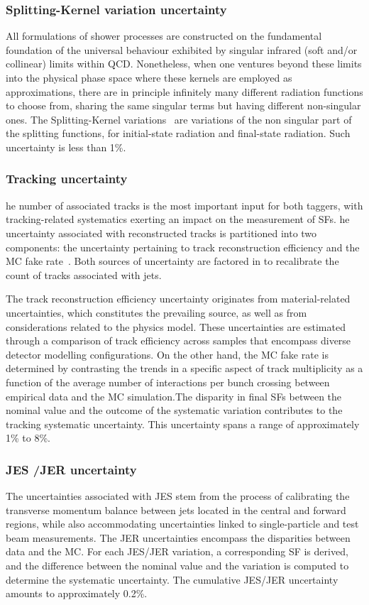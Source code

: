 \subsubsection{Splitting-Kernel variation uncertainty}
All formulations of shower processes are constructed on the fundamental foundation of the universal behaviour exhibited by singular infrared (soft and/or collinear) limits within QCD. Nonetheless, when one ventures beyond these limits into the physical phase space where these kernels are employed as approximations, there are in principle infinitely many different radiation functions to choose from, sharing the same singular terms but having different non-singular ones.  The Splitting-Kernel variations~\cite{Mrenna:2016sih} are variations of the non singular part of the splitting functions, for initial-state radiation and final-state radiation. Such uncertainty is less than 1\%.
  
    \subsubsection{Tracking uncertainty}

he number of associated tracks is the most important input for both taggers, with tracking-related systematics exerting an impact on the measurement of SFs. he uncertainty associated with reconstructed tracks is partitioned into two components: the uncertainty pertaining to track reconstruction efficiency and the MC fake rate~\cite{ATLAS:2017kyn}. Both sources of uncertainty are factored in to recalibrate the count of tracks associated with jets.

 The track reconstruction efficiency uncertainty originates from material-related uncertainties, which constitutes the prevailing source, as well as from considerations related to the physics model. These uncertainties are estimated through a comparison of track efficiency across samples that encompass diverse detector modelling configurations. On the other hand, the MC fake rate is determined by contrasting the trends in a specific aspect of track multiplicity as a function of the average number of interactions per bunch crossing between empirical data and the MC simulation.The disparity in final SFs between the nominal value and the outcome of the systematic variation contributes to the tracking systematic uncertainty. This uncertainty spans a range of approximately 1\% to 8\%.

  \subsubsection{JES /JER uncertainty }
The uncertainties associated with JES stem from the process of calibrating the transverse momentum balance between jets located in the central and forward regions, while also accommodating uncertainties linked to single-particle and test beam measurements. The JER uncertainties encompass the disparities between data and the MC. For each JES/JER variation, a corresponding SF is derived, and the difference between the nominal value and the variation is computed to determine the systematic uncertainty. The cumulative JES/JER uncertainty amounts to approximately 0.2\%.
  

